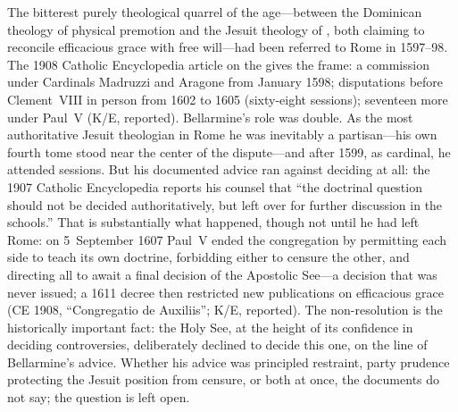 The bitterest purely theological quarrel of the age---between the
Dominican theology of physical premotion and the Jesuit theology of
, both claiming to reconcile efficacious grace
with free will---had been referred to Rome in 1597--98. The 1908
Catholic Encyclopedia article on the 
gives the frame: a commission under Cardinals Madruzzi and Aragone
from January 1598; disputations before Clement~VIII in person from
1602 to 1605 (sixty-eight sessions); seventeen more under Paul~V
(K/E, reported). Bellarmine's role was double. As the most
authoritative Jesuit theologian in Rome he was inevitably a
partisan---his own fourth tome  stood near the
center of the dispute---and after 1599, as cardinal, he attended
sessions. But his documented advice ran against deciding at all:
the 1907 Catholic Encyclopedia reports his counsel that ``the
doctrinal question should not be decided authoritatively, but left
over for further discussion in the schools.'' That is
substantially what happened, though not until he had left Rome: on
5~September 1607 Paul~V ended the congregation by permitting each
side to teach its own doctrine, forbidding either to censure the
other, and directing all to await a final decision of the
Apostolic See---a decision that was never issued; a 1611 decree
then restricted new publications on efficacious grace (CE 1908,
``Congregatio de Auxiliis''; K/E, reported). The non-resolution is
the historically important fact: the Holy See, at the height of
its confidence in deciding controversies, deliberately declined to
decide this one, on the line of Bellarmine's advice. Whether his
advice was principled restraint, party prudence protecting the
Jesuit position from censure, or both at once, the documents do
not say; the question is left open.
